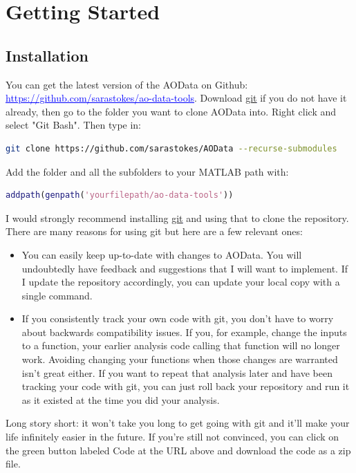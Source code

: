 \documentclass[10pt]{exam}
\newcommand\myurl[1]{\textcolor{blue}{\underline{#1}}}
\begin{document}
\section{Getting Started}
	\subsection{Installation}
		\noindent You can get the latest version of the AOData on Github: \myurl{https://github.com/sarastokes/ao-data-tools}. Download \myurl{\href{https://git-scm.com/}{git}} if you do not have it already, then go to the folder you want to clone AOData into. Right click and select "Git Bash". Then type in:
		\begin{lstlisting}[language=bash]
git clone https://github.com/sarastokes/AOData --recurse-submodules
		\end{lstlisting}
		
		\noindent Add the folder and all the subfolders to your MATLAB path with:
		\begin{lstlisting}[language=matlab]
addpath(genpath('yourfilepath/ao-data-tools'))
		\end{lstlisting} 
		I would strongly recommend installing \myurl{\href{https://git-scm.com/}{git}} and using that to clone the repository. There are many reasons for using git but here are a few relevant ones:
		\begin{itemize}
			\item You can easily keep up-to-date with changes to AOData. You will undoubtedly have feedback and suggestions that I will want to implement. If I update the repository accordingly, you can update your local copy with a single command.
			\item If you consistently track your own code with git, you don't have to worry about backwards compatibility issues. If you, for example, change the inputs to a function, your earlier analysis code calling that function will no longer work. Avoiding changing your functions when those changes are warranted isn't great either. If you want to repeat that analysis later and have been tracking your code with git, you can just roll back your repository and run it as it existed at the time you did your analysis. 
		\end{itemize}
		Long story short: it won't take you long to get going with git and it'll make your life infinitely easier in the future. 
		If you're still not convinced, you can click on the green button labeled Code at the URL above and download the code as a zip file. 
	
\end{document}

